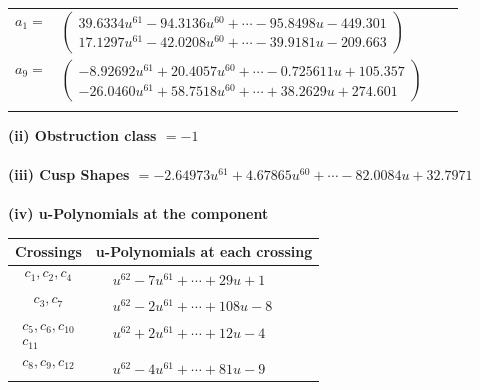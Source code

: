 \documentclass[1p]{elsarticle_modified}
\theoremstyle{definition}
\begin{document}
\begin{tabular}{m{7pt} m{180pt} m{7pt} m{180pt} }
\flushright $a_{1}=$&$\begin{pmatrix}39.6334 u^{61}-94.3136 u^{60}+\cdots-95.8498 u-449.301\\17.1297 u^{61}-42.0208 u^{60}+\cdots-39.9181 u-209.663\end{pmatrix}$ \\
\flushright $a_{9}=$&$\begin{pmatrix}-8.92692 u^{61}+20.4057 u^{60}+\cdots-0.725611 u+105.357\\-26.0460 u^{61}+58.7518 u^{60}+\cdots+38.2629 u+274.601\end{pmatrix}$\\&\end{tabular}
\flushleft \textbf{(ii) Obstruction class $= -1$}\\~\\
\flushleft \textbf{(iii) Cusp Shapes $= -2.64973 u^{61}+4.67865 u^{60}+\cdots-82.0084 u+32.7971$}\\~\\
\newpage\renewcommand{\arraystretch}{1}
\flushleft \textbf{(iv) u-Polynomials at the component}\newline \\
\begin{tabular}{m{50pt}|m{274pt}}
Crossings & \hspace{64pt}u-Polynomials at each crossing \\
\hline $$\begin{aligned}c_{1},c_{2},c_{4}\end{aligned}$$&$\begin{aligned}
&u^{62}-7 u^{61}+\cdots+29 u+1
\end{aligned}$\\
\hline $$\begin{aligned}c_{3},c_{7}\end{aligned}$$&$\begin{aligned}
&u^{62}-2 u^{61}+\cdots+108 u-8
\end{aligned}$\\
\hline $$\begin{aligned}c_{5},c_{6},c_{10}\\c_{11}\end{aligned}$$&$\begin{aligned}
&u^{62}+2 u^{61}+\cdots+12 u-4
\end{aligned}$\\
\hline $$\begin{aligned}c_{8},c_{9},c_{12}\end{aligned}$$&$\begin{aligned}
&u^{62}-4 u^{61}+\cdots+81 u-9
\end{aligned}$\\
\hline
\end{tabular}\\~\\
\end{document}

